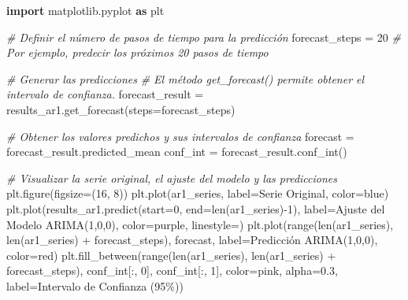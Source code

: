 \documentclass[
  11pt,
]{article}
\newenvironment{Shaded}{}{}
\newcommand{\BuiltInTok}[1]{\textcolor[rgb]{0.00,0.50,0.00}{#1}}
\newcommand{\CommentTok}[1]{\textcolor[rgb]{0.38,0.63,0.69}{\textit{#1}}}
\newcommand{\DecValTok}[1]{\textcolor[rgb]{0.25,0.63,0.44}{#1}}
\newcommand{\FloatTok}[1]{\textcolor[rgb]{0.25,0.63,0.44}{#1}}
\newcommand{\ImportTok}[1]{\textcolor[rgb]{0.00,0.50,0.00}{\textbf{#1}}}
\newcommand{\NormalTok}[1]{#1}
\newcommand{\OperatorTok}[1]{\textcolor[rgb]{0.40,0.40,0.40}{#1}}
\newcommand{\StringTok}[1]{\textcolor[rgb]{0.25,0.44,0.63}{#1}}
\begin{document}
\begin{Shaded}
\begin{Highlighting}[]
\ImportTok{import}\NormalTok{ matplotlib.pyplot }\ImportTok{as}\NormalTok{ plt}

\CommentTok{\# Definir el número de pasos de tiempo para la predicción}
\NormalTok{forecast\_steps }\OperatorTok{=} \DecValTok{20} \CommentTok{\# Por ejemplo, predecir los próximos 20 pasos de tiempo}

\CommentTok{\# Generar las predicciones}
\CommentTok{\# El método get\_forecast() permite obtener el intervalo de confianza.}
\NormalTok{forecast\_result }\OperatorTok{=}\NormalTok{ results\_ar1.get\_forecast(steps}\OperatorTok{=}\NormalTok{forecast\_steps)}

\CommentTok{\# Obtener los valores predichos y sus intervalos de confianza}
\NormalTok{forecast }\OperatorTok{=}\NormalTok{ forecast\_result.predicted\_mean}
\NormalTok{conf\_int }\OperatorTok{=}\NormalTok{ forecast\_result.conf\_int()}

\CommentTok{\# Visualizar la serie original, el ajuste del modelo y las predicciones}
\NormalTok{plt.figure(figsize}\OperatorTok{=}\NormalTok{(}\DecValTok{16}\NormalTok{, }\DecValTok{8}\NormalTok{))}
\NormalTok{plt.plot(ar1\_series, label}\OperatorTok{=}\StringTok{\textquotesingle{}Serie Original\textquotesingle{}}\NormalTok{, color}\OperatorTok{=}\StringTok{\textquotesingle{}blue\textquotesingle{}}\NormalTok{)}
\NormalTok{plt.plot(results\_ar1.predict(start}\OperatorTok{=}\DecValTok{0}\NormalTok{, end}\OperatorTok{=}\BuiltInTok{len}\NormalTok{(ar1\_series)}\OperatorTok{{-}}\DecValTok{1}\NormalTok{), label}\OperatorTok{=}\StringTok{\textquotesingle{}Ajuste del Modelo ARIMA(1,0,0)\textquotesingle{}}\NormalTok{, color}\OperatorTok{=}\StringTok{\textquotesingle{}purple\textquotesingle{}}\NormalTok{, linestyle}\OperatorTok{=}\StringTok{\textquotesingle{}{-}{-}\textquotesingle{}}\NormalTok{)}
\NormalTok{plt.plot(}\BuiltInTok{range}\NormalTok{(}\BuiltInTok{len}\NormalTok{(ar1\_series), }\BuiltInTok{len}\NormalTok{(ar1\_series) }\OperatorTok{+}\NormalTok{ forecast\_steps), forecast, label}\OperatorTok{=}\StringTok{\textquotesingle{}Predicción ARIMA(1,0,0)\textquotesingle{}}\NormalTok{, color}\OperatorTok{=}\StringTok{\textquotesingle{}red\textquotesingle{}}\NormalTok{)}
\NormalTok{plt.fill\_between(}\BuiltInTok{range}\NormalTok{(}\BuiltInTok{len}\NormalTok{(ar1\_series), }\BuiltInTok{len}\NormalTok{(ar1\_series) }\OperatorTok{+}\NormalTok{ forecast\_steps),}
\NormalTok{                 conf\_int[:, }\DecValTok{0}\NormalTok{], conf\_int[:, }\DecValTok{1}\NormalTok{], color}\OperatorTok{=}\StringTok{\textquotesingle{}pink\textquotesingle{}}\NormalTok{, alpha}\OperatorTok{=}\FloatTok{0.3}\NormalTok{, label}\OperatorTok{=}\StringTok{\textquotesingle{}Intervalo de Confianza (95\%)\textquotesingle{}}\NormalTok{)}


\end{Highlighting}
\end{Shaded}
\end{document}
